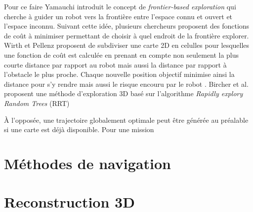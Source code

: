 Pour ce faire Yamauchi introduit le concept de \textit{frontier-based exploration} qui cherche à guider un robot vers la frontière entre l'espace connu et ouvert et l'espace inconnu. Suivant cette idée, plusieurs chercheurs proposent des fonctions de coût à minimiser permettant de choisir à quel endroit de la frontière explorer. Wirth et Pellenz proposent de subdiviser une carte 2D en celulles pour lesquelles une fonction de coût est calculée en prenant en compte non seulement la plus courte distance par rapport au robot mais aussi la distance par rapport à l'obstacle le plus proche. Chaque nouvelle position objectif minimise ainsi la distance pour s'y rendre mais aussi le risque encouru par le robot \citep{Wirth2007}. Bircher et al. proposent une méthode d'exploration 3D basé sur l'algorithme \textit{Rapidly explory Random Trees} (RRT)



À l'opposée, une trajectoire globalement optimale peut être générée au préalable si une carte est déjà disponible. Pour une mission 



\section{Méthodes de navigation}

\section{Reconstruction 3D}
